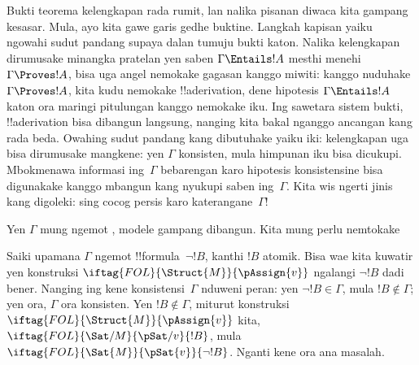 \documentclass[../../../include/open-logic-section]{subfiles}
\begin{document}
      {}
      {}


Bukti teorema kelengkapan rada rumit, lan nalika pisanan diwaca kita
gampang kesasar. Mula, ayo kita gawe garis gedhe buktine. Langkah
kapisan yaiku ngowahi sudut pandang supaya dalan tumuju bukti katon.
Nalika kelengkapan dirumusake minangka pratelan yen saben $\Gamma
\Entails !A$ mesthi menehi $\Gamma \Proves !A$, bisa uga angel
nemokake gagasan kanggo miwiti: kanggo nuduhake $\Gamma \Proves !A$,
kita kudu nemokake !!a{derivation}, dene hipotesis $\Gamma \Entails
!A$ katon ora maringi pitulungan kanggo nemokake iku. Ing sawetara
sistem bukti, !!a{derivation} bisa dibangun langsung, nanging kita
bakal nganggo ancangan kang rada beda. Owahing sudut pandang kang
dibutuhake yaiku iki: kelengkapan uga bisa dirumusake mangkene: yen
$\Gamma$ konsisten, mula himpunan iku bisa dicukupi. Mbokmenawa informasi
ing~$\Gamma$ bebarengan karo hipotesis konsistensine bisa digunakake
kanggo mbangun  kang
nyukupi saben  ing~$\Gamma$.
Kita wis ngerti jinis  kang
digoleki: sing cocog persis karo katerangane~$\Gamma$!{}

Yen $\Gamma$ mung ngemot , modele gampang dibangun.
Kita mung perlu nemtokake

Saiki upamana $\Gamma$ ngemot !!{formula}~$\lnot !B$, kanthi $!B$
atomik. Bisa wae kita kuwatir yen konstruksi
$\iftag{FOL}{\Struct{M}}{\pAssign{v}}$ ngalangi $\lnot !B$ dadi
bener. Nanging ing kene konsistensi~$\Gamma$ nduweni peran: yen
$\lnot !B \in \Gamma$, mula $!B \notin \Gamma$; yen ora, $\Gamma$
ora konsisten. Yen $!B \notin \Gamma$, miturut konstruksi
$\iftag{FOL}{\Struct{M}}{\pAssign{v}}$ kita,
$\iftag{FOL}{\Sat/{M}}{\pSat/{v}}{!B}$, mula
$\iftag{FOL}{\Sat{M}}{\pSat{v}}{\lnot !B}$. Nganti kene ora ana
masalah.
\end{document}
